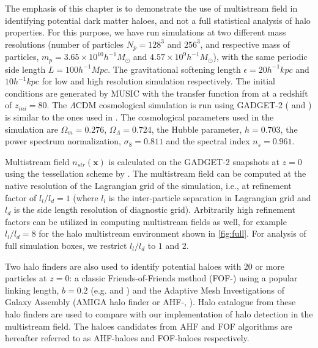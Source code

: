 The emphasis of this chapter is to demonstrate the use of multistream field in identifying potential dark matter haloes, and not a full statistical analysis of halo properties. For this purpose, we have run simulations at two different mass resolutions (number of particles $N_p = 128^3$ and $256^3$, and respective mass of particles, $m_p = 3.65 \times 10^{10} h^{-1} M_{\odot}$ and $ 4.57 \times 10^{9} h^{-1} M_{\odot}$), with the same periodic side length $L = 100 h^{-1} Mpc$. The gravitational softening length $\epsilon = 20 h^{-1} kpc$ and $10 h^{-1} kpc$ for low and high resolution simulation respectively. The initial conditions are generated by {MUSIC} \citep{Hahn2011a} with the transfer function from \cite{Eisenstein1998a} at a redshift of $z_{ini}= 80$. The $\Lambda$CDM cosmological simulation is run using {GADGET-2} (\citealt{Springel2005c} and \citealt{Springel2001}) is similar to the ones used in \cite{Ramachandra2017}. The cosmological parameters used in the simulation are $\Omega_{m}= 0.276$, $\Omega_{\Lambda}= 0.724$, the Hubble parameter, $h = 0.703$, the power spectrum normalization, $\sigma_8 = 0.811$ and the spectral index $n_s= 0.961$. 



Multistream field $n_{str}(\mathbf{x})$ is calculated on the GADGET-2 snapshots at $z=0$ using the tessellation scheme by \cite{Shandarin2012}. The multistream field can be computed at the native resolution of the Lagrangian grid of the simulation, i.e., at refinement factor of $l_l/l_d = 1$ (where $l_l$ is the inter-particle separation in Lagrangian grid and $l_d$ is the side length resolution of diagnostic grid). Arbitrarily high refinement factors can be utilized in computing multistream fields as well, for example  $l_l/l_d = 8$ for the halo multistream environment shown in \autoref{fig:full}. For analysis of full simulation boxes, we restrict $l_l/l_d$ to $1$ and $2$. 

Two halo finders are also used to identify potential haloes with 20 or more particles at $z= 0$: a classic Friends-of-Friends method (FOF-\citealt{Davis1985}) using a popular linking length, $ b= 0.2$ (e.g. \citealt{Frenk1988} and \citealt{Lacey1994}) and the Adaptive Mesh Investigations of Galaxy Assembly (AMIGA halo finder or AHF-\citealt{Knollmann2009a}, \citealt{Gill2004a}). Halo catalogue from these halo finders are used to compare with our implementation of halo detection in the multistream field. The haloes candidates from AHF and FOF algorithms are hereafter referred to as AHF-haloes and FOF-haloes respectively.




